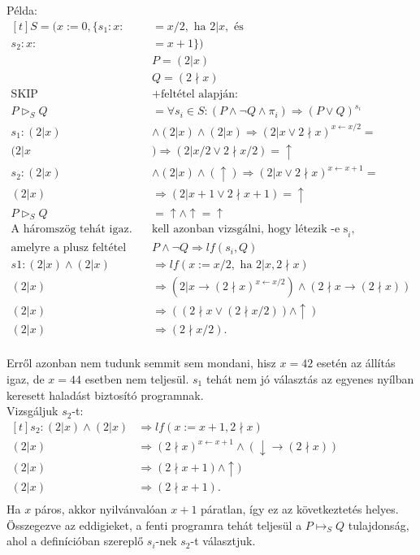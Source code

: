 \documentclass[12pt]{article}
\newcommand{\egyenesnyil}[2]{$#1 \mapsto_S #2$}
\begin{document}
	Példa:
	$
	\begin{aligned}[t]
	S = (x:=0, \{s_1: x :&= x/2, \text{ ha } 2|x, \text{ és}\\
	s_2: x :&= x+1\})\\
	&P = (2|x)\\
	&Q = (2\nmid x)\\
	\text{SKIP} &+ \text{feltétel alapján: }\\
	P \vartriangleright_S Q &=\forall s_i \in S: (P \land \neg Q \land \pi_i) \Rightarrow (P \lor Q)^{s_i}\\
	s_1: (2|x) &\land (2|x) \land (2|x) \Rightarrow (2|x \lor 2\nmid x)^{x \leftarrow x/2} = \\
	(2|x &) \Rightarrow (2|x/2 \lor 2\nmid x/2) = \uparrow \\
	s_2: (2|x) &\land (2|x) \land (\uparrow) \Rightarrow (2|x \lor 2\nmid x)^{x \leftarrow x+1} = \\
	(2|x) &\Rightarrow (2|x+1 \lor 2\nmid x+1) = \uparrow\\
	P \vartriangleright_S Q &= \uparrow \land \uparrow = \uparrow\\
	\text{A háromszög tehát igaz. Meg } & \text{kell azonban vizsgálni, hogy létezik -e s}_i,\\
	\text{amelyre a plusz feltétel teljesül: }& P\land \neg Q \Rightarrow lf(s_i, Q)\\
	s1: (2|x) \land (2|x) &\Rightarrow lf(x:=x/2, \text{ ha } 2|x, 2\nmid x)\\
	(2|x) &\Rightarrow (2|x \rightarrow (2\nmid x)^{x\leftarrow x/2}) \land (2\nmid x \rightarrow (2\nmid x))\\
	(2|x) &\Rightarrow ((2\nmid x \lor (2\nmid x/2)) \land \uparrow)\\
	(2|x) &\Rightarrow (2 \nmid x/2).\\
	\end{aligned}
	$
	
	Erről azonban nem tudunk semmit sem mondani, hisz $x=42$ esetén az állítás igaz, de $x=44$ esetben nem teljesül. $s_1$ tehát nem jó választás az egyenes nyílban keresett haladást biztosító programnak.\\
	Vizsgáljuk $s_2$-t:\\
	$
	\begin{aligned}[t]
	s_2: (2|x) \land (2|x) &\Rightarrow lf(x:=x+1, 2\nmid x)\\
	(2|x) &\Rightarrow (2\nmid x)^{x\leftarrow x+1} \land (\downarrow \rightarrow (2\nmid x))\\
	(2|x) &\Rightarrow (2\nmid x+1) \land \uparrow)\\
	(2|x) &\Rightarrow (2 \nmid x+1).\\
	\end{aligned}
	$
	\\
	Ha $x$ páros, akkor nyilvánvalóan $x+1$ páratlan, így ez az következtetés helyes. Összegezve az eddigieket, a fenti programra tehát teljesül a \egyenesnyil{P}{Q} tulajdonság, ahol a definícióban szereplő $s_i$-nek $s_2$-t választjuk.
	
\end{document}
